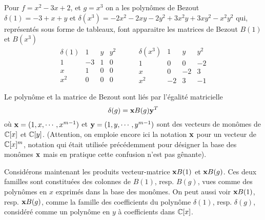 \documentclass{standalone}
\begin{document}
\begin{exmp}
Pour $f = x^2 - 3x + 2$, et $g = x^3$ on a les polynômes de Bezout $\delta(1) = -3 + x + y$ et $\delta(x^3) = -2x^2 - 2xy -2y^2 + 3x^2y + 3xy^2 -x^2y^2$ qui, représentés sous forme de tableaux, font apparaitre les matrices de Bezout $B(1)$ et $B(x^3)$
$$
\begin{array}{c|ccc}
\delta(1) & 1 & y & y^2\\
\hline
1 & -3 & 1 & 0\\
x & 1 & 0 & 0\\
x^2 & 0 & 0 & 0
\end{array}
\hspace{1cm}
\begin{array}{c|ccc}
\delta(x^3) & 1 & y & y^2\\
\hline
1 & 0 & 0 & -2\\
x & 0 & -2 & 3\\
x^2 & -2 & 3 & -1
\end{array}
$$
\end{exmp}

\begin{rem}
Le polynôme et la matrice de Bezout sont liés par l'égalité matricielle
\begin{equation}
	\label{pmB}
	\delta(g) = \bold{x} B(g) \bold{y}^T
\end{equation}
où $\bold{x} = (1, x,\cdots, x^{m-1})$ et $\bold{y} = (1, y,\cdots, y^{m-1})$ sont des vecteurs de monômes de $\mathbb{C}[x]$ et $\mathbb{C}[y]$. (Attention, on emploie encore ici la notation ${\bold x}$ pour un vecteur de $\mathbb{C}[x]^m$, notation qui était utilisée précédemment pour désigner la base des monômes ${\bold x}$ mais en pratique cette confusion n'est pas gênante).
\end{rem}
Considérons maintenant les produits vecteur-matrice $\bold{x}B(1)$ et $\bold{x}B(g)$. Ces deux familles sont constituées des colonnes de $B(1)$, resp. $B(g)$, vues comme des polynômes en $x$ exprimés dans la base des monômes. On peut aussi voir $\bold{x}B(1)$, resp. $\bold{x}B(g)$, comme la famille des coefficients du polynôme $\delta(1)$, resp. $\delta(g)$, considéré comme un polynôme en $y$ à coefficients dans $\mathbb{C}[x]$.
\end{document}
